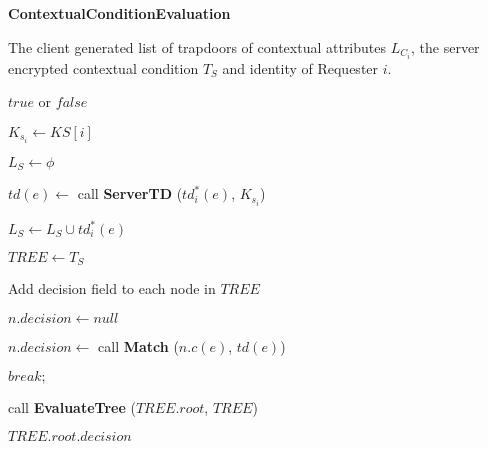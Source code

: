 \documentclass[final,5p,times,twocolumn]{elsarticle}
\newcommand{\algofontsize}{\fontsize{7}{8}\selectfont}
\begin{document}
\begin{algorithm}[htp]
{\algofontsize
\caption{\textbf{ContextualConditionEvaluation}}

\label{algo:match-contextual-condition}

\begin{algorithmic}[1]

\REQUIRE The client generated list of trapdoors of contextual attributes $L_{C_i}$, the server encrypted contextual condition $T_{S}$ and identity of Requester $i$.

\ENSURE $\mathit{true}$ or $\mathit{false}$

\medskip

\STATE $K_{s_i} \leftarrow KS[i]$ {\algofontsize {}} \label{line:cc-match-ks}

\STATE $L_{S} \leftarrow \phi$ \label{line:cc-match-init-list}

 \label{line:cc-match-loop-s-td}
	
	\STATE $td(e) \leftarrow$ call \textbf{ServerTD} ($td^*_i (e)$, $K_{s_i}$) \label{line:cc-match-call-s-td}
	
	\STATE $L_{S} \leftarrow L_{S} \cup td^*_i (e)$ \label{line:cc-match-update-list}
	
\ENDFOR

\STATE $TREE \leftarrow T_{S}$ \label{line:cc-match-copy-tree}

\STATE Add decision field to each node in $\mathit{TREE}$ \label{line:cc-match-add-field}

 \label{line:cc-match-loop-tree-init}

	\STATE $n.decision \leftarrow null$ \label{line:cc-match-init-field}

\ENDFOR


	\label{line:cc-match-loop-tree-match}
	
	 \label{line:cc-match-loop-list-match}
	
		\STATE $n.decision \leftarrow$ call \textbf{Match} ($n.c(e)$, $td(e)$) \label{line:cc-match-decision}

		 \label{line:cc-match-if-success}
			\RETURN $break;$ \label{line:cc-match-stop}
		\ENDIF  
	
	\ENDFOR

\ENDFOR

\STATE call \textbf{EvaluateTree} ($TREE.root$, $\mathit{TREE}$) {\algofontsize {}} \label{line:cc-match-call-eval-tree}

\RETURN $TREE.root.decision$ \label{line:cc-match-return-decision}

\end{algorithmic}
}
\end{algorithm}
\end{document}
